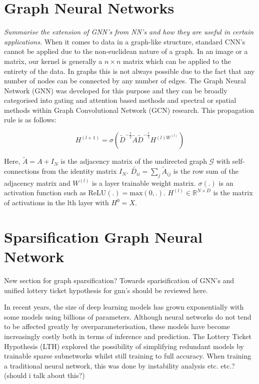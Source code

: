 \documentclass[honours,12pt]{unswthesis}
\numberwithin{equation}{section}
\begin{document}
\section{Graph Neural Networks}\label{gnn}
\textit{Summarise the extension of GNN's from NN's and how they are useful in certain applications.} 
When it comes to data in a graph-like structure, standard CNN's cannot be applied due to the non-euclidean nature of a graph.
In an image or a matrix, our kernel is generally a $n\times n$ matrix which can be applied to the entirety of the data. In graphs
this is not always possible due to the fact that any number of nodes can be connected by any number of edges.\cite{sanchez-lengeling2021a} 
The Graph Neural Network (GNN) was developed for this purpose and they can be broadly categorised into gating and attention based methods\cite{veličković2018graph} 
and spectral or spatial methods within Graph Convolutional Network (GCN) research.\cite{kipf2017semisupervised} This propagation rule is as follows:

\begin{equation}
    H^{(l+1)} = \sigma(\tilde{D}^{-\frac{1}{2}} \tilde{A} \tilde{D}^{-\frac{1}{2}} H^{(l) W^{(l)}})
\end{equation}

Here, $\tilde{A} = A + I_N$ is the adjacency matrix of the undirected graph $\mathcal{G}$ with self-connections from the identity matrix $I_N$.
$\tilde{D_{ii}} = \sum_{j} \tilde{A}_{ij} $ is the row sum of the adjacency matrix and $W^{(l)}$ is a layer trainable weight matrix. 
$\sigma(.)$ is an activation function such as $\text{ReLU}(.) = \text{max}(0, .)$. $H^{(l)} \in \mathbb{R}^{N \times D}$ is the matrix of activations
in the lth layer with $H^0 = X$. 


\section{Sparsification Graph Neural Network}\label{vae}
New section for graph sparsification?
Towards sparisification of GNN's \cite{peng2023sparsification}
and unified lottery ticket hypothesis \cite{chen2021unified} for gnn's should be reviewed here.

In recent years, the size of deep learning models has grown exponentially with some models using billions of parameters. Although neural networks do not 
tend to be affected greatly by overparameterisation, these models have become increasingly costly both in terms of inference and prediction. The 
Lottery Ticket Hypothesis (LTH)\cite{frankle2020linear} explored the possibility of simplifying redundant models by trainable sparse subnetworks whilst
still training to full accuracy. When training a traditional neural network, this was done by instability analysis etc. etc.? (should i talk about this?)
\end{document}
